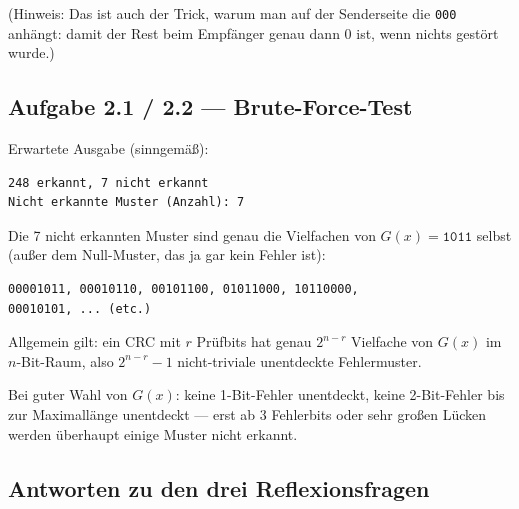 (Hinweis: Das ist auch der Trick, warum man auf der Senderseite die
\texttt{000} anhängt: damit der Rest beim Empfänger genau dann 0 ist,
wenn nichts gestört wurde.)

\subsection*{Aufgabe 2.1 / 2.2 — Brute-Force-Test}

Erwartete Ausgabe (sinngemäß):

\begin{verbatim}
248 erkannt, 7 nicht erkannt
Nicht erkannte Muster (Anzahl): 7
\end{verbatim}

Die 7 nicht erkannten Muster sind genau die Vielfachen von $G(x) =
\texttt{1011}$ selbst (außer dem Null-Muster, das ja gar kein Fehler
ist):

\begin{verbatim}
00001011, 00010110, 00101100, 01011000, 10110000,
00010101, ... (etc.)
\end{verbatim}

Allgemein gilt: ein CRC mit $r$ Prüfbits hat genau $2^{n-r}$ Vielfache
von $G(x)$ im $n$-Bit-Raum, also $2^{n-r} - 1$ nicht-triviale
unentdeckte Fehlermuster.

Bei guter Wahl von $G(x)$: keine 1-Bit-Fehler unentdeckt, keine
2-Bit-Fehler bis zur Maximallänge unentdeckt — erst ab 3 Fehlerbits
oder sehr großen Lücken werden überhaupt einige Muster nicht erkannt.

\subsection*{Antworten zu den drei Reflexionsfragen}


